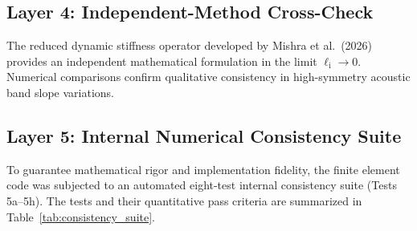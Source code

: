 \subsection{Layer 4: Independent-Method Cross-Check}
\label{sec:layer4_crosscheck}
The reduced dynamic stiffness operator developed by Mishra et al.\ (2026) \cite{mishra2026anchorC} provides an independent mathematical formulation in the limit $\ell_{\mathrm{i}} \to 0$. Numerical comparisons confirm qualitative consistency in high-symmetry acoustic band slope variations.

\subsection{Layer 5: Internal Numerical Consistency Suite}
\label{sec:layer5_suite}
To guarantee mathematical rigor and implementation fidelity, the finite element code was subjected to an automated eight-test internal consistency suite (Tests 5a--5h). The tests and their quantitative pass criteria are summarized in Table~\ref{tab:consistency_suite}.

\begin{table}[htbp]
\centering
\caption{Layer 5 internal numerical consistency verification suite.}
\label{tab:consistency_suite}

\end{table}

